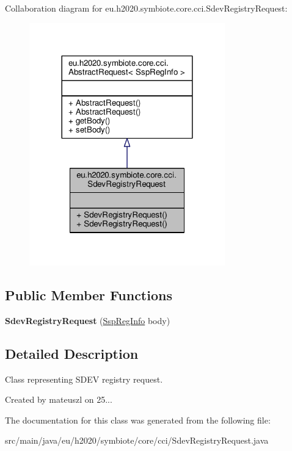 Collaboration diagram for eu.\+h2020.\+symbiote.\+core.\+cci.\+Sdev\+Registry\+Request\+:
\nopagebreak
\begin{figure}[H]
\begin{center}
\leavevmode
\includegraphics[width=240pt]{classeu_1_1h2020_1_1symbiote_1_1core_1_1cci_1_1SdevRegistryRequest__coll__graph}
\end{center}
\end{figure}
\subsection*{Public Member Functions}
\begin{DoxyCompactItemize}
\item 
\mbox{\label{classeu_1_1h2020_1_1symbiote_1_1core_1_1cci_1_1SdevRegistryRequest_afdab0ca81a0fbf5c4b22e853acaee670}} 
{\bfseries Sdev\+Registry\+Request} (\hyperlink{classeu_1_1h2020_1_1symbiote_1_1cloud_1_1model_1_1ssp_1_1SspRegInfo}{Ssp\+Reg\+Info} body)
\end{DoxyCompactItemize}


\subsection{Detailed Description}
Class representing S\+D\+EV registry request.

Created by mateuszl on 25... 

The documentation for this class was generated from the following file\+:\begin{DoxyCompactItemize}
\item 
src/main/java/eu/h2020/symbiote/core/cci/Sdev\+Registry\+Request.\+java\end{DoxyCompactItemize}
